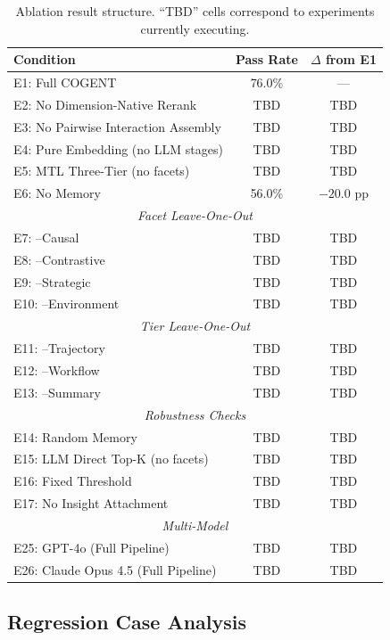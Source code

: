 \documentclass[letterpaper]{article} %
\begin{document}
\begin{table}[t]
\centering
\caption{Ablation result structure. ``TBD'' cells correspond to experiments currently executing.}
\label{tab:ablation-results}
\begin{tabular}{lcc}
\toprule
\textbf{Condition} & \textbf{Pass Rate} & \textbf{$\Delta$ from E1} \\
\midrule
E1: Full \textsc{COGENT} & 76.0\% & --- \\
E2: No Dimension-Native Rerank & TBD & TBD \\
E3: No Pairwise Interaction Assembly & TBD & TBD \\
E4: Pure Embedding (no LLM stages) & TBD & TBD \\
E5: MTL Three-Tier (no facets) & TBD & TBD \\
E6: No Memory & 56.0\% & $-20.0$ pp \\
\midrule
\multicolumn{3}{c}{\textit{Facet Leave-One-Out}} \\
\midrule
E7: --Causal & TBD & TBD \\
E8: --Contrastive & TBD & TBD \\
E9: --Strategic & TBD & TBD \\
E10: --Environment & TBD & TBD \\
\midrule
\multicolumn{3}{c}{\textit{Tier Leave-One-Out}} \\
\midrule
E11: --Trajectory & TBD & TBD \\
E12: --Workflow & TBD & TBD \\
E13: --Summary & TBD & TBD \\
\midrule
\multicolumn{3}{c}{\textit{Robustness Checks}} \\
\midrule
E14: Random Memory & TBD & TBD \\
E15: LLM Direct Top-K (no facets) & TBD & TBD \\
E16: Fixed Threshold & TBD & TBD \\
E17: No Insight Attachment & TBD & TBD \\
\midrule
\multicolumn{3}{c}{\textit{Multi-Model}} \\
\midrule
E25: GPT-4o (Full Pipeline) & TBD & TBD \\
E26: Claude Opus 4.5 (Full Pipeline) & TBD & TBD \\
\bottomrule
\end{tabular}
\end{table}

\subsection{Regression Case Analysis}
\end{document}
